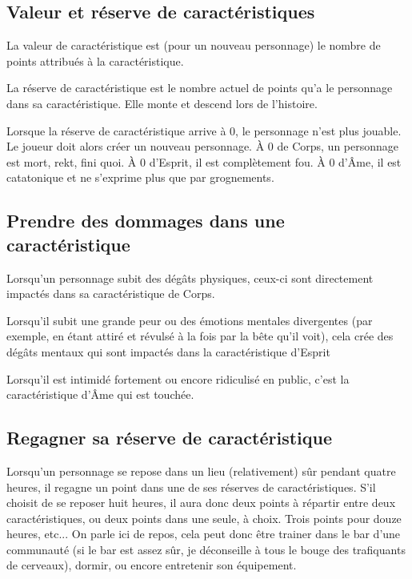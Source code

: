 \documentclass[10pt,twoside,twocolumn,openany,bg=print,justified]{dndbook}
\begin{document}
\subsection*{Valeur et réserve de caractéristiques}

La valeur de caractéristique est (pour un nouveau personnage) le nombre de points attribués à la caractéristique.

La réserve de caractéristique est le nombre actuel de points qu'a le personnage dans sa caractéristique. Elle monte et descend lors de l'histoire.

Lorsque la réserve de caractéristique arrive à 0, le personnage n'est plus jouable. Le joueur doit alors créer un nouveau personnage. À 0 de Corps, un personnage est mort, rekt, fini quoi. À 0 d'Esprit, il est complètement fou. À 0 d'Âme, il est catatonique et ne s'exprime plus que par grognements.

\subsection*{Prendre des dommages dans une caractéristique}

Lorsqu'un personnage subit des dégâts physiques, ceux-ci sont directement impactés dans sa caractéristique de Corps.

Lorsqu'il subit une grande peur ou des émotions mentales divergentes (par exemple, en étant attiré et révulsé à la fois par la bête qu'il voit), cela crée des dégâts mentaux qui sont impactés dans la caractéristique d'Esprit

Lorsqu'il est intimidé fortement ou encore ridiculisé en public, c'est la caractéristique d'Âme qui est touchée.

\subsection*{Regagner sa réserve de caractéristique}

Lorsqu'un personnage se repose dans un lieu (relativement) sûr pendant quatre heures, il regagne un point dans une de ses réserves de caractéristiques. S'il choisit de se reposer huit heures, il aura donc deux points à répartir entre deux caractéristiques, ou deux points dans une seule, à choix. Trois points pour douze heures, etc... On parle ici de repos, cela peut donc être trainer dans le bar d'une communauté (si le bar est assez sûr, je déconseille à tous le bouge des trafiquants de cerveaux), dormir, ou encore entretenir son équipement.
\end{document}
